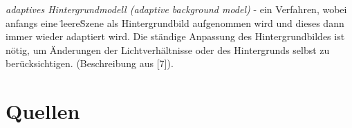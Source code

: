 \documentclass[10pt,a4paper]{article}
\begin{document}
\begin {description}
\item {\it adaptives Hintergrundmodell (adaptive background model)} - ein Verfahren, wobei anfangs eine \"leere\" Szene als Hintergrundbild aufgenommen wird und dieses dann immer wieder adaptiert wird. Die ständige Anpassung des Hintergrundbildes ist nötig, um Änderungen der Lichtverhältnisse oder des Hintergrunds selbst zu berücksichtigen. (Beschreibung aus [7]).

\end {description}

\newpage
\section{Quellen} 

\vspace*{1.5cm}
\end{document}
